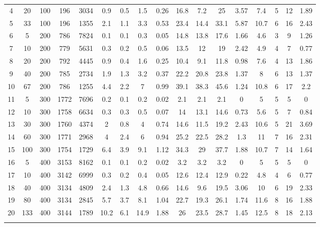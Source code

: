 \documentclass[11pt]{article}
\newcommand{\np}{\newpage}
\begin{document}
\begin{appendices}
\begin{landscape}
\begin{longtable}[c]{ccccc|cccc|cccc|cccc}
				\rowcolor[HTML]{EFEFEF} 
				4 & 20 & 100 & 196 & 3034 & 0.9 & 0.5 & 1.5 & 0.26 & 16.8 & 7.2 & 25 & 3.57 & 7.4 & 5 & 12 & 1.89 \\
				\rowcolor[HTML]{EFEFEF} 
				5 & 33 & 100 & 196 & 1355 & 2.1 & 1.1 & 3.3 & 0.53 & 23.4 & 14.4 & 33.1 & 5.87 & 10.7 & 6 & 16 & 2.43 \\
				6 & 5 & 200 & 786 & 7824 & 0.1 & 0.1 & 0.3 & 0.05 & 14.8 & 13.8 & 17.6 & 1.66 & 4.6 & 3 & 9 & 1.26 \\
				7 & 10 & 200 & 779 & 5631 & 0.3 & 0.2 & 0.5 & 0.06 & 13.5 & 12 & 19 & 2.42 & 4.9 & 4 & 7 & 0.77 \\
				8 & 20 & 200 & 792 & 4445 & 0.9 & 0.4 & 1.6 & 0.25 & 10.4 & 9.1 & 11.8 & 0.98 & 7.6 & 4 & 13 & 1.86 \\
				9 & 40 & 200 & 785 & 2734 & 1.9 & 1.3 & 3.2 & 0.37 & 22.2 & 20.8 & 23.8 & 1.37 & 8 & 6 & 13 & 1.37 \\
				10 & 67 & 200 & 786 & 1255 & 4.4 & 2.2 & 7 & 0.99 & 39.1 & 38.3 & 45.6 & 1.24 & 10.8 & 6 & 17 & 2.2 \\
				\rowcolor[HTML]{EFEFEF} 
				11 & 5 & 300 & 1772 & 7696 & 0.2 & 0.1 & 0.2 & 0.02 & 2.1 & 2.1 & 2.1 & 0 & 5 & 5 & 5 & 0 \\
				\rowcolor[HTML]{EFEFEF} 
				12 & 10 & 300 & 1758 & 6634 & 0.3 & 0.3 & 0.5 & 0.07 & 14 & 13.1 & 14.6 & 0.73 & 5.6 & 5 & 7 & 0.84 \\
				\rowcolor[HTML]{EFEFEF} 
				13 & 30 & 300 & 1760 & 4374 & 2 & 0.8 & 4 & 0.74 & 14.6 & 11.5 & 19.2 & 2.43 & 10.6 & 5 & 21 & 3.69 \\
				\rowcolor[HTML]{EFEFEF} 
				14 & 60 & 300 & 1771 & 2968 & 4 & 2.4 & 6 & 0.94 & 25.2 & 22.5 & 28.2 & 1.3 & 11 & 7 & 16 & 2.31 \\
				\rowcolor[HTML]{EFEFEF} 
				15 & 100 & 300 & 1754 & 1729 & 6.4 & 3.9 & 9.1 & 1.12 & 34.3 & 29 & 37.7 & 1.88 & 10.7 & 7 & 14 & 1.64 \\
				16 & 5 & 400 & 3153 & 8162 & 0.1 & 0.1 & 0.2 & 0.02 & 3.2 & 3.2 & 3.2 & 0 & 5 & 5 & 5 & 0 \\
				17 & 10 & 400 & 3142 & 6999 & 0.3 & 0.2 & 0.4 & 0.05 & 12.6 & 12.4 & 12.9 & 0.22 & 4.8 & 4 & 6 & 0.77 \\
				18 & 40 & 400 & 3134 & 4809 & 2.4 & 1.3 & 4.8 & 0.66 & 14.6 & 9.6 & 19.5 & 3.06 & 10 & 6 & 19 & 2.33 \\
				19 & 80 & 400 & 3134 & 2845 & 5.7 & 3.7 & 8.1 & 1.04 & 22.7 & 19.3 & 26.1 & 1.74 & 11.6 & 8 & 16 & 1.88 \\
				20 & 133 & 400 & 3144 & 1789 & 10.2 & 6.1 & 14.9 & 1.88 & 26 & 23.5 & 28.7 & 1.45 & 12.5 & 8 & 18 & 2.13 \\ \np

\end{longtable}
\end{landscape}
\end{appendices}
\end{document}

